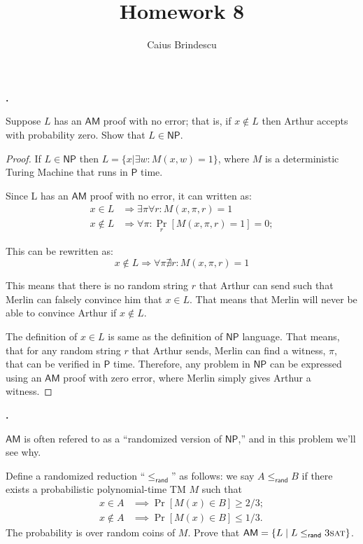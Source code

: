\documentclass[letterpaper,11pt]{article}
\title{Homework 8}
\author{Caius Brindescu}
\newcommand{\cc}[1]{\ensuremath{\textsf{#1}}\xspace}
\renewcommand{\P}{\cc{P}}
\newcommand{\NP}{\cc{NP}}
\newcommand{\AM}{\cc{AM}}
\newcommand{\randreduc}{\le_{\textsf{rand}}}
\newcommand{\ThreeSAT}{\ensuremath{\textsc{3sat}}\xspace}
\newcounter{problem}
\newenvironment{problem}%
{%
	\stepcounter{problem}%
	\textbf{\theproblem.}
	\large
}{\\}%
\newcommand{\tm}{Turing Machine}
\begin{document}
\maketitle

\begin{problem}
Suppose $L$ has an $\AM$ proof with no error; that is, if $x \not\in L$ then Arthur accepts with probability zero. 
Show that $L \in \NP$.
\end{problem}

\begin{proof}

If $L \in \NP$ then $L = \{ x | \exists w : M(x,w) = 1\}$, where $M$ is a deterministic \tm{} that runs in $\P$ time.

Since L has an $\AM$ proof with no error, it can written as:
\begin{align*}
	x \in L &\Rightarrow \exists \pi \forall r : M(x,\pi,r) = 1 \\
	x \not \in L &\Rightarrow \forall \pi : \underset{r}{\Pr}[M(x,\pi,r) = 1] = 0;
\end{align*}

This can be rewritten as:
\[
	x \not \in L \Rightarrow \forall \pi \nexists r: M(x,\pi,r) = 1
\]

This means that there is no random string $r$ that Arthur can send such that Merlin can falsely convince him that $x \in L$.
That means that Merlin will never be able to convince Arthur if $x \not \in L$.

The definition of $x \in L$ is same as the definition of $\NP$ language.
That means, that for any random string $r$ that Arthur sends, Merlin can find a witness, $\pi$, that can be verified in $\P$ time.
Therefore, any problem in $\NP$ can be expressed using an $\AM$ proof with zero error, where Merlin simply gives Arthur a witness.

\end{proof}


\begin{problem}
\AM is often refered to as a ``randomized version of \NP,'' and in this problem we'll see why.

Define a randomized reduction ``$\randreduc$'' as follows: we say $A \randreduc B$ if there exists a probabilistic polynomial-time TM $M$ such that
    \begin{align*}
        x \in A &\implies \Pr[ M(x) \in B ] \ge 2/3 ;   \\
        x \not\in A &\implies \Pr[ M(x) \in B ] \le 1/3 .
    \end{align*}
The probability is over random coins of $M$.
Prove that $\AM = \{ L \mid L \randreduc \ThreeSAT \}$.
\end{problem}
\end{document}
